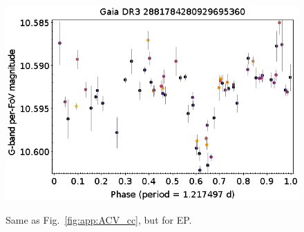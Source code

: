 \documentclass[longauth]{aa}
\begin{document}
\begin{appendix}
\begin{figure}
\hspace{2mm}
 \includegraphics[width=0.45\hsize]{figures/appendix/EP-65.png} \\
\vspace{4mm}
 \caption{Same as Fig.~\ref{fig:app:ACV_cc}, but for EP.} %
 \label{fig:app:EP_cc}
\end{figure}




\end{appendix}
\end{document}
